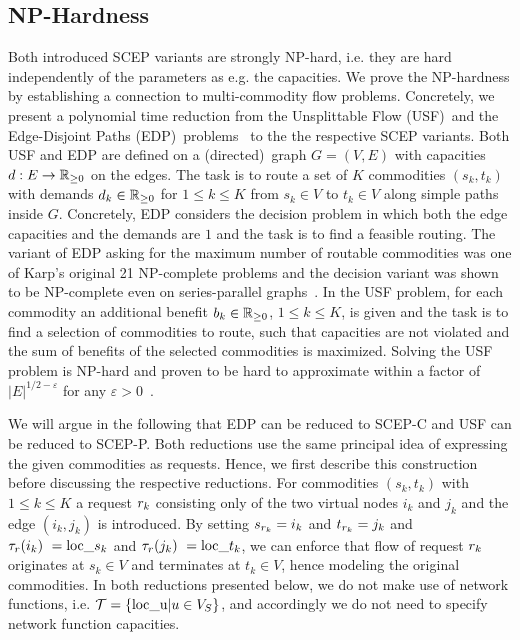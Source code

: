 \documentclass[10pt, conference, letterpaper]{IEEEtran}
\begin{document}
\subsection{NP-Hardness}
\label{sec:np-hardness}

Both introduced SCEP variants are strongly NP-hard, i.e. they are hard independently of the parameters as e.g. the capacities. We prove the NP-hardness 
by establishing a connection to multi-commodity flow problems.
Concretely, we present a polynomial time reduction from the Unsplittable Flow (USF)~and the Edge-Disjoint Paths (EDP)~problems~\cite{Guruswami2003473} to the  the respective SCEP variants. Both USF and EDP are defined on a (directed)~graph $G=(V,E)$ with capacities $d : E \to \mathbb{R}_{\geq 0}$ on the edges. The task is to route a set of $K$ commodities $(s_k,t_k)$ with demands $d_k \in \mathbb{R}_{\geq 0}$ for $1 \leq k \leq K$ from  $s_k \in V$ to $t_k \in V$ along simple paths inside $G$. Concretely, EDP considers the decision problem in which both the edge capacities and the demands are $1$ and the task is to find a feasible routing. The variant of EDP asking for the maximum number of routable commodities was one of Karp's original 21 NP-complete problems and the decision variant was shown to be NP-complete even on series-parallel graphs~\cite{Nishizeki2001177}. In the USF problem, for each commodity an additional benefit $b_k \in \mathbb{R}_{\geq 0}$, $1 \leq k \leq K$, is given and the task is to find a selection of commodities to route, such that capacities are not violated and the sum of benefits of the selected commodities is maximized. Solving the USF problem is NP-hard and proven to be hard to approximate within a factor of $|E|^{1/2-\varepsilon}$ for any $\varepsilon > 0$~\cite{Guruswami2003473}.

We will argue in the following that EDP can be reduced to SCEP-C and USF can be reduced to SCEP-P. Both reductions use the same principal idea of expressing the given commodities as requests. Hence, we first describe this construction before discussing the respective reductions. For commodities $(s_k,t_k)$ with $1\leq k \leq K$ a request $r_k$ consisting only of the two virtual nodes $i_k$ and $j_k$ and the edge $(i_k,j_k)$ is introduced. By setting $s_{r_k} = i_k$ and $t_{r_k} = j_k$ and $\tau_{r}(i_k)~= \textnormal{loc\_}s_{k}$ and $\tau_{r}(j_k)~= \textnormal{loc\_}t_{k}$, we can enforce that flow of request $r_k$ originates at $s_k \in V$ and terminates at $t_k \in V$, hence modeling the original commodities. In both reductions presented below, we do not make use of network functions, i.e. $\mathcal{T} = \{\textnormal{loc\_u} | u \in V_S\}$, and accordingly we do not need to specify network function capacities.
\end{document}
